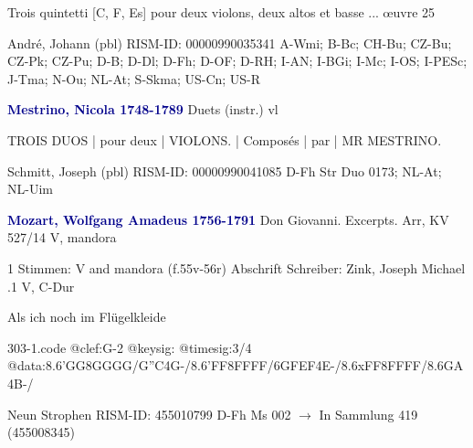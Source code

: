 \documentclass[twocolumn]{book}
\begin{document}
\newline \begin{itshape}Trois quintetti [C, F, Es] pour deux violons, deux altos et basse ... œuvre 25\end{itshape} 
\newline André, Johann  (pbl)
\newline RISM-ID: 00000990035341
\newline A-Wmi; B-Bc; CH-Bu; CZ-Bu; CZ-Pk; CZ-Pu; D-B; D-Dl; D-Fh; D-OF; D-RH; I-AN; I-BGi; I-Mc; I-OS; I-PESc; J-Tma; N-Ou; NL-At; S-Skma; US-Cn; US-R
\newline \par \vspace{7pt} \textcolor{darkblue}{\textbf{Mestrino, Nicola  1748-1789}}
\newline Duets (instr.)
 vl
\newline \begin{itshape}TROIS DUOS | pour deux | VIOLONS. | Composés | par | MR MESTRINO.\end{itshape} 
\newline Schmitt, Joseph  (pbl)
\newline RISM-ID: 00000990041085
\newline D-Fh  Str Duo 0173; NL-At; NL-Uim
\newline \par \vspace{7pt} \textcolor{darkblue}{\textbf{Mozart, Wolfgang Amadeus  1756-1791}}
\newline Don Giovanni. Excerpts. Arr, KV 527/14
\newline V, mandora
\newline \begin{itshape}\end{itshape} 
\newline \textcolor{darkblue}{}  1 Stimmen: V and mandora  (f.55v-56r)
\newline Abschrift
\newline Schreiber: Zink, Joseph Michael
.1  V, C-Dur
\newline \begin{footnotesize} Als ich noch im Flügelkleide \end{footnotesize}  
\begin{filecontents*}{303-1.code}
@clef:G-2
@keysig:
@timesig:3/4
@data:8.6'GG8GGGG/{G''C}4G-/8.6'FF8FFFF/{6GFEF}4E-/8.6xFF8FFFF/{8.6GA}4B-/
\end{filecontents*}
\newline
%
\newline Neun Strophen
\newline RISM-ID: 455010799
\newline D-Fh  Ms 002
\newline $\rightarrow$ In Sammlung 419 (455008345)
      
\end{document}
